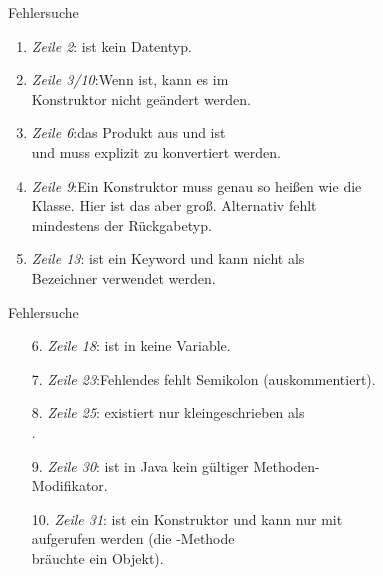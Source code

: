 {\SidebarSolution
\begin{frame}[c]{Fehlersuche}
   \begin{enumerate}[<+(1)->]
      \itemsep9.25pt
      \item \textit{Zeile 2}:\quad {} ist kein Datentyp.
      \item \textit{Zeile 3/10}:\quad Wenn   ist, kann es im\\\qquad Konstruktor nicht geändert werden.
      \item \textit{Zeile 6}:\quad das Produkt aus  und  ist \\\qquad und muss explizit zu  konvertiert werden.
      \item \textit{Zeile 9}:\quad Ein Konstruktor muss genau so heißen wie die\\\qquad Klasse. Hier ist das  aber groß. Alternativ fehlt\\\qquad mindestens der Rückgabetyp.
      \item \textit{Zeile 13}:\quad {} ist ein Keyword und kann nicht als\\\qquad Bezeichner verwendet werden.
   \end{enumerate}
\end{frame}

\begin{frame}[c]{Fehlersuche}
   \begin{enumerate}[<+(1)->]
      \itemsep9.25pt
      \item[6.] \textit{Zeile 18}:\quad {} ist in  keine Variable.
      \item[7.] \textit{Zeile 23}:\quad Fehlendes fehlt Semikolon (auskommentiert).
      \item[8.] \textit{Zeile 25}:\quad {} existiert nur kleingeschrieben als\\\qquad{}.
      \item[9.] \textit{Zeile 30}:\quad {} ist in Java kein gültiger Methoden-\\\qquad Modifikator.
      \item[10.] \textit{Zeile 31}:\quad {} ist ein Konstruktor und kann nur mit\\\qquad{} aufgerufen werden (die -Methode\\\qquad bräuchte ein Objekt).
   \end{enumerate}
\end{frame}
\SidebarReset

}

